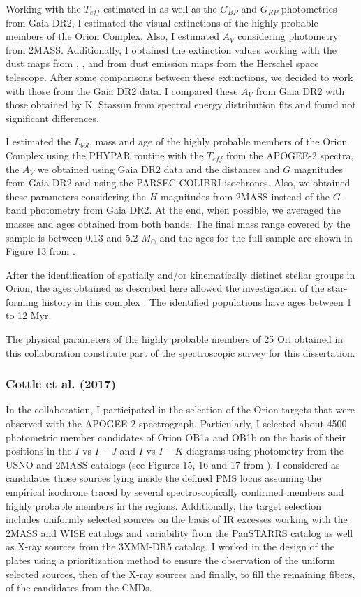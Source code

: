 \documentclass[12pt]{article}
\begin{document}
Working with the $T_{eff}$ estimated in \citet{Kounkel2018} as well as the $G_{BP}$ and $G_{RP}$ photometries from Gaia DR2, I estimated the visual extinctions of the highly probable members of the Orion Complex. Also, I estimated $A_V$ considering photometry from 2MASS. Additionally, I obtained the extinction values working with the dust maps from \citet{Schlegel1998}, \citet{Gontcharov2017}, \citet{Green2018} and from dust emission maps from the Herschel space telescope. After some comparisons between these extinctions, we decided to work with those from the Gaia DR2 data. I compared these $A_V$ from Gaia DR2 with those obtained by K. Stassun from spectral energy distribution fits and found not significant differences.

I estimated the $L_{bol}$, mass and age of the highly probable members of the Orion Complex using the PHYPAR routine with the $T_{eff}$ from the APOGEE-2 spectra, the $A_V$ we obtained using Gaia DR2 data and the distances and $G$ magnitudes from Gaia DR2 and using the PARSEC-COLIBRI isochrones. Also, we obtained these parameters considering the $H$ magnitudes from 2MASS instead of the $G$-band photometry from Gaia DR2. At the end, when possible, we averaged the masses and ages obtained from both bands. The final mass range covered by the sample is between 0.13 and 5.2 $M_\odot$ and the ages for the full sample are shown in Figure 13 from \citet{Kounkel2018}. 

After the identification of spatially and/or kinematically distinct stellar groups in Orion, the ages obtained as described here allowed the investigation of the star-forming history in this complex \citep{Kounkel2018}. The identified populations have ages between 1 to 12 Myr.

The physical parameters of the highly probable members of 25 Ori obtained in this collaboration constitute part of the spectroscopic survey for this dissertation.

\subsubsection{Cottle et al. (2017)}
\label{sec:Cottle}
In the \citet{Cottle2018} collaboration, I participated in the selection of the Orion targets that were observed with the APOGEE-2 spectrograph. Particularly, I selected about 4500 photometric member candidates of Orion OB1a and OB1b on the basis of their positions in the $I$ vs $I-J$ and $I$ vs $I-K$ diagrams using photometry from the USNO and 2MASS catalogs (see Figures 15, 16 and 17 from \citealt{Cottle2018}). I considered as candidates those sources lying inside the defined PMS locus assuming the empirical isochrone traced by several spectroscopically confirmed members and highly probable members in the regions. Additionally, the target selection includes uniformly selected sources on the basis of IR excesses working with the 2MASS and WISE catalogs and variability from the PanSTARRS catalog as well as X-ray sources from the 3XMM-DR5 catalog. I worked in the design of the plates using a prioritization method to ensure the observation of the uniform selected sources, then of the X-ray sources and finally, to fill the remaining fibers, of the candidates from the CMDs.
\end{document}
